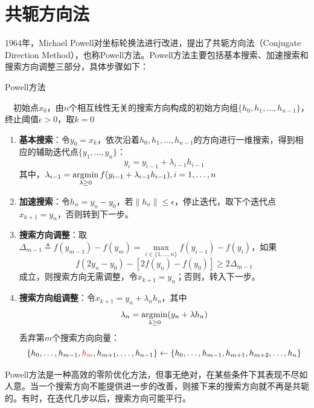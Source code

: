 \section{共轭方向法}
1964年，Michael Powell\cite{powell1964efficient}对坐标轮换法进行改进，提出了共轭方向法（Conjugate Direction Method），也称Powell方法。Powell方法主要包括基本搜索、加速搜索和搜索方向调整三部分，具体步骤如下：
\begin{algorithm}[htbp]
        \caption{Powell方法}
        \begin{algorithmic}
            \REQUIRE ~~初始点$x_0$，由$n$个相互线性无关的搜索方向构成的初始方向组$\{h_0,h_1,\ldots, h_{n-1}\}$，终止阈值$\epsilon>0$，取$k=0$\\
            \STATE
            \begin{enumerate}
                \item \textbf{基本搜索}：令$y_0 = x_k$，依次沿着$h_0,h_1,\ldots, h_{n-1}$的方向进行一维搜索，得到相应的辅助迭代点$\{y_1,\ldots, y_n\}$：
                \[
                    y_i = y_{i-1} + \lambda_{i-1} h_{i-1}
                \]
                其中，$\lambda_{i-1} = \operatorname*{\mathrm{\arg\!\min}}\limits_{\lambda\ge 0} f(y_{i-1} + \lambda_{i-1} h_{i-1}),i=1,\ldots,n$
                \item \textbf{加速搜索}：令$h_n = y_n - y_0$，若$\|h_n\|\le \epsilon$，停止迭代，取下个迭代点$x_{k+1} = y_n$，否则转到下一步。
                \item \textbf{搜索方向调整}：取$\Delta_{m-1} \triangleq f(y_{m-1}) - f(y_m) = \max\limits_{i\in\{1,\ldots,n\}} f(y_{i-1}) - f(y_i)$，如果
                \[
                    f(2y_n - y_0) - [2f(y_n) - f(y_0)] \ge 2 \Delta_{m-1}
                \]
                成立，则搜索方向无需调整，令$x_{k+1} = y_n$；否则，转入下一步。
                \item \textbf{搜索方向组调整}：令$x_{k+1} = y_n + \lambda_n h_n$，其中
                \[
                    \lambda_n = \operatorname*{\mathrm{\arg\!\min}}\limits_{\lambda\ge 0} (y_n + \lambda h_n)
                \]
                丢弃第$m$个搜索方向向量：
                \[
                    \{h_0,\ldots, h_{m-1}, \textcolor{red}{h_m}, h_{m+1},\ldots, h_{n-1}\} \leftarrow \{h_0,\ldots, h_{m-1}, h_{m+1}, h_{m+2}, \ldots, h_{n}\}
                \]
            \end{enumerate}
            \ENDFOR
        \end{algorithmic}
\end{algorithm}

Powell方法是一种高效的零阶优化方法，但事无绝对，在某些条件下其表现不尽如人意。当一个搜索方向不能提供进一步的改善，则接下来的搜索方向就不再是共轭的。有时，在迭代几步以后，搜索方向可能平行。


